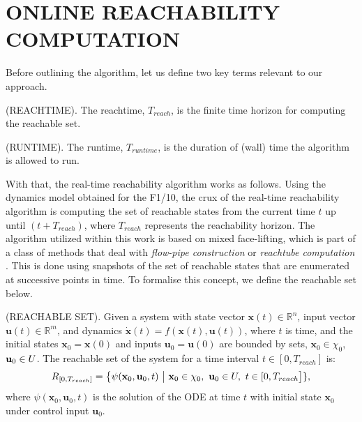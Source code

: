 \documentclass[manuscript,screen,review]{acmart}
\begin{document}
\section{ONLINE REACHABILITY COMPUTATION}

Before outlining the algorithm, let us define two key terms relevant to our approach.\smallskip

\begin{definition}%
(REACHTIME). The reachtime, $T_{reach}$, is the finite time horizon for computing the reachable set.
\end{definition}%
\begin{definition}%
(RUNTIME). The runtime, $T_{runtime}$, is the duration of (wall) time the algorithm is allowed to run.
\end{definition}%

With that, the real-time reachability algorithm works as follows. Using the dynamics model obtained for the F1/10, the crux of the real-time reachability algorithm is computing the set of reachable states from the current time $t$ up until $(t+T_{reach})$, where $T_{reach}$ represents the reachability horizon. The algorithm utilized within this work is based on mixed face-lifting, which is part of a class of methods that deal with \textit{flow-pipe construction} or \textit{reachtube computation} \cite{Johnson2016}. This is done using snapshots of the set of reachable states that are enumerated at successive points in time. To formalise this concept, we define the reachable set below.
\smallskip
\begin{definition}%
(REACHABLE SET). Given a system with state vector $\textbf{x}(t) \in \mathbb{R}^n$, input vector $\textbf{u}(t) \in \mathbb{R}^m$, and dynamics $\dot{\textbf{x}}(t)=f(\textbf{x}(t),\textbf{u}(t))$, where $t$ is time, and the initial states $\textbf{x}_0 = \textbf{x}(0)$ and inputs $\textbf{u}_0 = \textbf{u}(0)$ are bounded by sets, $\textbf{x}_0 \in \chi_0$, $\textbf{u}_0 \in \mathnormal{U}$. The reachable set of the system for a time interval $ t \in [0,T_{reach}]$ is:%
%
\begin{equation*}%
    \mathnormal{R}_{[0,T_{reach}]} = \big \{ \psi(\textbf{x}_0,\textbf{u}_0,t) \ \big| \ \textbf{x}_0 \in \chi_0, \ \textbf{u}_0 \in \mathnormal{U}, \ t \in [0,T_{reach}\big]\},%
\end{equation*}%
%
\noindent where $\psi(\textbf{x}_0,\textbf{u}_0,t)$ is the solution of the ODE at time $t$ with initial state $\textbf{x}_0$ under control input $\textbf{u}_0$.
\end{definition}%
\smallskip
\end{document}
